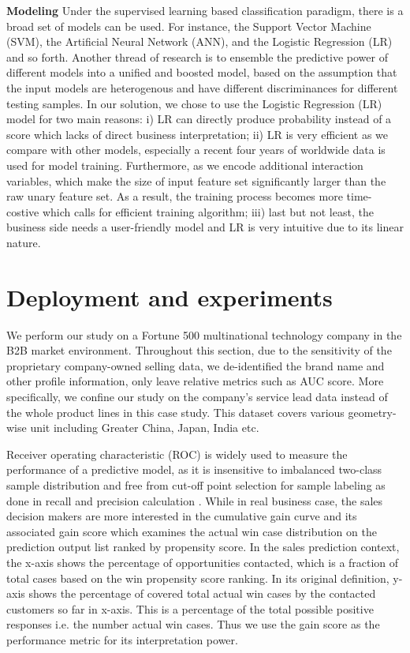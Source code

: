 \documentclass[10pt,conference]{IEEEtran}
\begin{document}
\textbf{Modeling} Under the supervised learning based classification paradigm, there is a broad set of models can be used. For instance, the Support Vector Machine (SVM), the Artificial Neural Network (ANN), and the Logistic Regression (LR) and so forth. Another thread of research is to ensemble the predictive power of different models into a unified and boosted model, based on the assumption that the input models are heterogenous and have different discriminances for different testing samples. In our solution, we chose to use the Logistic Regression (LR) model for two main reasons: i) LR can directly produce probability instead of a score which lacks of direct business interpretation; ii) LR is very efficient as we compare with other models, especially a recent four years of worldwide data is used for model training. Furthermore, as we encode additional interaction variables, which make the size of input feature set significantly larger than the raw unary feature set. As a result, the training process becomes more time-costive which calls for efficient training algorithm; iii) last but not least, the business side needs a user-friendly model and LR is very intuitive due to its linear nature.







\section{Deployment and experiments}
We perform our study on a Fortune 500 multinational technology company in the B2B market environment. Throughout this section, due to the sensitivity of the proprietary company-owned selling data, we de-identified the brand name and other profile information, only leave relative metrics such as AUC score. More specifically, we confine our study on the company's service lead data instead of the whole product lines in this case study. This dataset covers various geometry-wise unit including Greater China, Japan, India etc.

Receiver operating characteristic (ROC) is widely used to measure the performance of a predictive model, as it is insensitive to imbalanced two-class sample distribution and free from cut-off point selection for sample labeling as done in recall and precision calculation \cite{brown2006receiver,fawcett2006introduction}. While in real business case, the sales decision makers are more interested in the cumulative gain curve \cite{jarvelin2002cumulated} and its associated gain score which examines the actual win case distribution on the prediction output list ranked by propensity score. In the sales prediction context, the x-axis shows the percentage of opportunities contacted, which is a fraction of total cases based on the win propensity score ranking. In its original definition, y-axis shows the percentage of covered total actual win cases by the contacted customers so far in x-axis. This is a percentage of the total possible positive responses i.e. the number actual win cases. Thus we use the gain score as the performance metric for its interpretation power.
\end{document}
